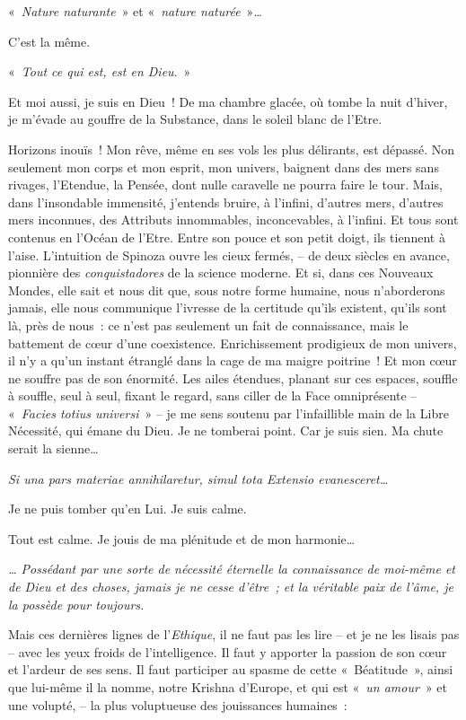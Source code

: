 «~\emph{Nature naturante}~» et «~\emph{nature naturée}~»\ldots{}

C'est la même.

«~\emph{Tout ce qui est, est en Dieu}.~»

Et moi aussi, je suis en Dieu~! De ma chambre glacée, où tombe la nuit
d'hiver, je m'évade au gouffre de la Substance, dans le soleil blanc de
l'Etre.

Horizons inouïs~! Mon rêve, même en ses vols les plus délirants, est
dépassé. Non seulement mon corps et mon esprit, mon univers, baignent
dans des mers sans rivages, l'Etendue, la Pensée, dont nulle caravelle
ne pourra faire le tour. Mais, dans l'insondable immensité, j'entends
bruire, à l'infini, d'autres mers, d'autres mers inconnues, des
Attributs innommables, inconcevables, à l'infini. Et tous sont contenus
en l'Océan de l'Etre. Entre son pouce et son petit doigt, ils tiennent à
l'aise. L'intuition de Spinoza ouvre les cieux fermés, -- de deux
siècles en avance, pionnière des \emph{conquistadores} de la science
moderne. Et si, dans ces Nouveaux Mondes, elle sait et nous dit que,
sous notre forme humaine, nous n'aborderons jamais, elle nous communique
l'ivresse de la certitude qu'ils existent, qu'ils sont là, près de
nous~: ce n'est pas seulement un fait de connaissance, mais le battement
de c\oe ur d'une coexistence. Enrichissement prodigieux de mon univers, il
n'y a qu'un instant étranglé dans la cage de ma maigre poitrine~! Et mon
c\oe ur ne souffre pas de son énormité. Les ailes étendues, planant sur
ces espaces, souffle à souffle, seul à seul, fixant le regard, sans
ciller de la Face omniprésente -- «~\emph{Facies totius
universi}~» -- je me sens soutenu par
l'infaillible main de la Libre Nécessité, qui émane du Dieu. Je ne
tomberai point. Car je suis sien. Ma chute serait la sienne\ldots{}

\emph{Si una pars materiae annihilaretur, simul tota Extensio
evanesceret\ldots{}}

Je ne puis tomber qu'en Lui. Je suis calme.

Tout est calme. Je jouis de ma plénitude et de mon harmonie\ldots{}

\emph{\ldots{} Possédant par une sorte de nécessité éternelle la connaissance
de moi-même et de Dieu et des choses, jamais je ne cesse d'être~; et la
véritable paix de l'âme, je la possède pour toujours.}

Mais ces dernières lignes de l'\emph{Ethique}, il ne faut pas les lire
-- et je ne les lisais pas -- avec les yeux froids de l'intelligence. Il
faut y apporter la passion de son c\oe ur et l'ardeur de ses sens. Il faut
participer au spasme de cette «~Béatitude~», ainsi que lui-même il la
nomme, notre Krishna d'Europe, et qui est «~\emph{un amour}~» et une volupté, -- la plus voluptueuse
des jouissances humaines~:


